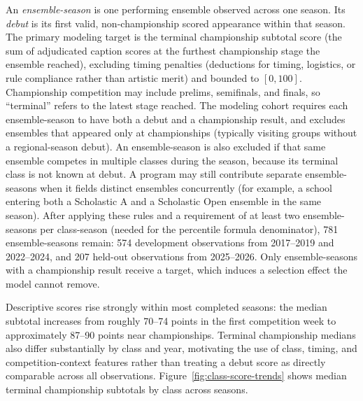 An \emph{ensemble-season} is one performing ensemble observed across one
season. Its \emph{debut} is its first valid, non-championship scored appearance
within that season. The primary modeling target is the terminal
championship subtotal score (the sum of adjudicated caption scores at the
furthest championship stage the ensemble reached), excluding timing penalties
(deductions for timing, logistics, or rule compliance rather than artistic merit)
and bounded to $[0, 100]$. Championship competition may include prelims,
semifinals, and finals, so ``terminal'' refers to the latest stage reached. The
modeling cohort requires each ensemble-season to have both a debut and a
championship result, and excludes ensembles that
appeared only at championships (typically visiting groups without a
regional-season debut). An ensemble-season is also excluded if that same
ensemble competes in multiple classes during the season, because its terminal
class is not known at debut. A program may still contribute separate
ensemble-seasons when it fields distinct ensembles concurrently (for example, a school entering both a Scholastic A and a Scholastic Open ensemble in the same season). After applying
these rules and a requirement of at least two ensemble-seasons per class-season (needed for the percentile formula denominator), 781 ensemble-seasons remain:
574 development observations from 2017--2019 and 2022--2024, and 207 held-out
observations from 2025--2026. Only ensemble-seasons with a championship result
receive a target, which induces a selection effect the model cannot remove.

Descriptive scores rise strongly within most completed seasons: the median
subtotal increases from roughly 70--74 points in the first competition week to
approximately 87--90 points near championships. Terminal championship medians
also differ substantially by class and year, motivating the use of class,
timing, and competition-context features rather than treating a debut score as
directly comparable across all observations.
Figure~\ref{fig:class-score-trends} shows median terminal championship
subtotals by class across seasons.


